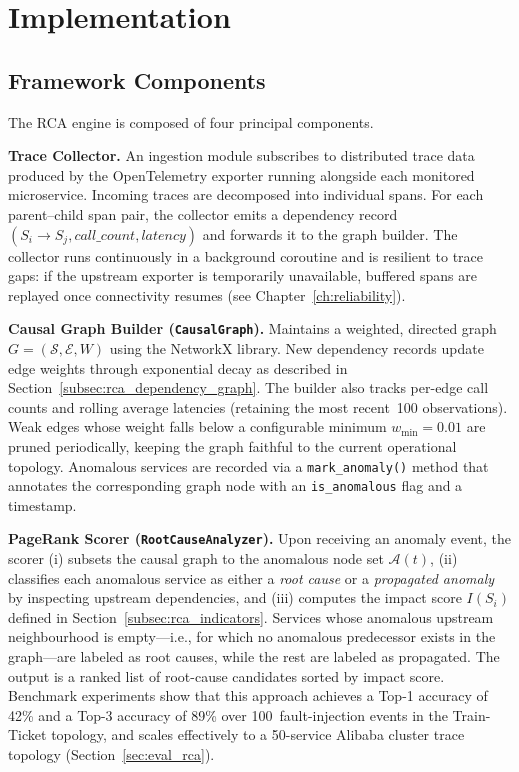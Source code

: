 \section{Implementation}
\label{sec:rca_implementation}

\subsection{Framework Components}
\label{subsec:rca_components}

The RCA engine is composed of four principal components.

\textbf{Trace Collector.} An ingestion module subscribes to distributed trace
data produced by the OpenTelemetry exporter running alongside each monitored
microservice. Incoming traces are decomposed into individual spans. For each
parent--child span pair, the collector emits a dependency record
$(S_i \to S_j, \textit{call\_count}, \textit{latency})$ and forwards it to
the graph builder. The collector runs continuously in a background coroutine
and is resilient to trace gaps: if the upstream exporter is temporarily
unavailable, buffered spans are replayed once connectivity resumes (see
Chapter~\ref{ch:reliability}).

\textbf{Causal Graph Builder (\texttt{CausalGraph}).} Maintains a weighted,
directed graph $G=(\mathcal{S},\mathcal{E},W)$ using the NetworkX library.
New dependency records update edge weights through exponential decay as
described in Section~\ref{subsec:rca_dependency_graph}. The builder also
tracks per-edge call counts and rolling average latencies (retaining the most
recent~100 observations). Weak edges whose weight falls below a configurable
minimum $w_{\min}=0.01$ are pruned periodically, keeping the graph faithful to
the current operational topology. Anomalous services are recorded via a
\texttt{mark\_anomaly()} method that annotates the corresponding graph node
with an \texttt{is\_anomalous} flag and a timestamp.

\textbf{PageRank Scorer (\texttt{RootCauseAnalyzer}).} Upon receiving an
anomaly event, the scorer (i) subsets the causal graph to the anomalous node
set $\mathcal{A}(t)$, (ii) classifies each anomalous service as either a
\emph{root cause} or a \emph{propagated anomaly} by inspecting upstream
dependencies, and (iii) computes the impact score $I(S_i)$ defined in
Section~\ref{subsec:rca_indicators}. Services whose anomalous upstream
neighbourhood is empty---i.e., for which no anomalous predecessor exists in the
graph---are labeled as root causes, while the rest are labeled as propagated.
The output is a ranked list of root-cause candidates sorted by impact score.
Benchmark experiments show that this approach achieves a Top-1 accuracy of 42\%
and a Top-3 accuracy of 89\% over 100~fault-injection events in the
Train-Ticket topology, and scales effectively to a 50-service Alibaba cluster
trace topology (Section~\ref{sec:eval_rca}).

